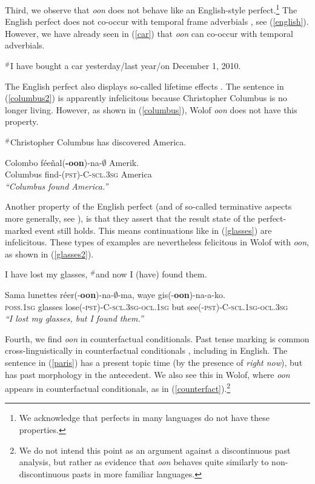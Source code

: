 \documentclass[output=paper
,modfonts
,nonflat]{langsci/langscibook}
\begin{document}
Third, we observe that \textit{oon} does not behave like an English-style perfect.\footnote{We acknowledge that perfects in many languages do not have these properties.} The English perfect does not co-occur with temporal frame adverbials \citep{klein92present}, see (\ref{english}). However, we have already seen in (\ref{car}) that \textit{oon} can co-occur with temporal adverbials.

\ea\label{english}
$^{\#}$I have bought a car yesterday/last year/on December 1, 2010.
\z

The English perfect also displays so-called lifetime effects \citep{mccawley71tense}. The sentence in (\ref{columbus2}) is apparently infelicitous because Christopher Columbus is no longer living. However, as shown in (\ref{columbus}), Wolof \textit{oon} does not have this property.

\ea\label{columbus2}
$^{\#}$Christopher Columbus has discovered America.
\z

\ea\label{columbus}
\gll Colombo f\'ee\~nal(\textbf{-oon})-na-$\emptyset$ Amerik.\\
Columbus find-(\textsc{pst)-C-scl.3sg} America\\
\glt \textit{``Columbus found America.''}
\z

Another property of the English perfect (and of so-called terminative aspects more generally, see \citealt{bohnemeyer02grammar}), is that they assert that the result state of the perfect-marked event still holds. This means continuations like in (\ref{glasses}) are infelicitous. These types of examples are nevertheless felicitous in Wolof with \textit{oon}, as shown in (\ref{glasses2}).

\ea\label{glasses} 
I have lost my glasses, $^{\#}$and now I (have) found them. 
\z

\ea\label{glasses2}
\gll Sama lunettes r\'eer(-\textbf{oon})-na-$\emptyset$-ma, waye gis(-\textbf{oon})-na-a-ko. \\
\textsc{poss.1sg} glasses lose\textsc{(-pst)-C-scl.3sg-ocl.1sg} but see\textsc{(-pst)-C-scl.1sg-ocl.3sg} \\
\glt \textit{``I lost my glasses, but I found them.''} 
\z

Fourth, we find \textit{oon} in counterfactual conditionals. Past tense marking is common cross-linguistically in counterfactual conditionals \citep{iatridou00grammatical, halpert12aspect}, including in English. The sentence in (\ref{paris}) has a present topic time (by the presence of \textit{right now}), but has past morphology in the antecedent. We also see this in Wolof, where \textit{oon} appears in counterfactual conditionals, as in (\ref{counterfact}).\footnote{We do not intend this point as an argument against a discontinuous past analysis, but rather as evidence that \textit{oon} behaves quite similarly to non-discontinuous pasts in more familiar languages.}  
\end{document}
